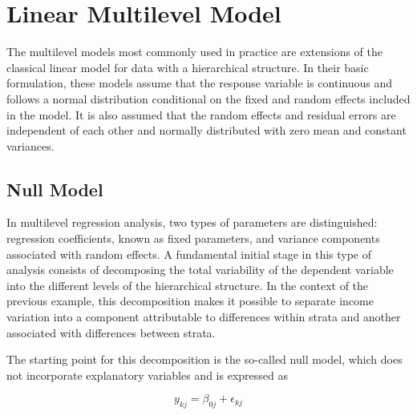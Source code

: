 \documentclass[
  english,
  12pt,
]{book}
\newenvironment{Shaded}{\begin{snugshade}}{\end{snugshade}}
\newcommand{\AttributeTok}[1]{\textcolor[rgb]{0.13,0.29,0.53}{#1}}
\newcommand{\FunctionTok}[1]{\textcolor[rgb]{0.13,0.29,0.53}{\textbf{#1}}}
\newcommand{\NormalTok}[1]{#1}
\newcommand{\OtherTok}[1]{\textcolor[rgb]{0.56,0.35,0.01}{#1}}
\newcommand{\SpecialCharTok}[1]{\textcolor[rgb]{0.81,0.36,0.00}{\textbf{#1}}}
\begin{document}
\begin{Shaded}
\end{Shaded}

\section{Linear Multilevel Model}\label{modelo-lineal-multinivel}

The multilevel models most commonly used in practice are extensions of the classical linear model for data with a hierarchical structure. In their basic formulation, these models assume that the response variable is continuous and follows a normal distribution conditional on the fixed and random effects included in the model. It is also assumed that the random effects and residual errors are independent of each other and normally distributed with zero mean and constant variances.

\subsection{Null Model}\label{sec-multinivel-muestras-complejas}

In multilevel regression analysis, two types of parameters are distinguished: regression coefficients, known as fixed parameters, and variance components associated with random effects. A fundamental initial stage in this type of analysis consists of decomposing the total variability of the dependent variable into the different levels of the hierarchical structure. In the context of the previous example, this decomposition makes it possible to separate income variation into a component attributable to differences within strata and another associated with differences between strata.

The starting point for this decomposition is the so-called null model, which does not incorporate explanatory variables and is expressed as

\[
y_{kj} = \beta_{0j} + \epsilon_{kj}
\]
\end{document}
